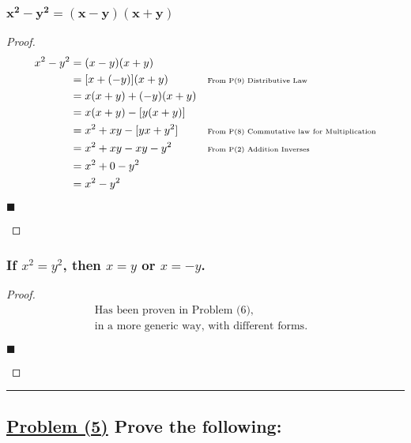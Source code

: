 \documentclass[letterpaper, 10 pt, conference]{ieeeconf}  %
\begin{document}
\subsubsection{$\boldsymbol{x^2 - y^2 = (x - y)(x + y)}$}

\begin{proof}
\begin{align}
     x^2 - y^2&= (x - y)(x + y) && \\
     &=[x + (-y)](x + y) && \text{\tiny{From P(9) Distributive Law}} \\ 
     &=x(x + y) + (-y)(x +y) &&\\
     &=x(x + y) - [y(x +y)] &&\\
     &=x^2 + xy - [yx + y^2] && \text{\tiny{From P(8) Commutative law for Multiplication}}\\
     &=x^2 + xy - xy - y^2 && \text{\tiny{From P(2) Addition Inverses}}\\
     &=x^2 + 0 - y^2 &&\\
     &=x^2 - y^2 &&
\end{align}
\begin{flushright}
$\blacksquare$
\end{flushright}
\end{proof}


\subsubsection{\textbf{If $x^2 = y^2$, then $x = y$ or $x = -y$.}}


\begin{proof}
\begin{align}
    & \text{Has been proven in Problem (6),} && \\
    & \text{in a more generic way, with different forms.}
\end{align}
\begin{flushright}
$\blacksquare$
\end{flushright}
\end{proof}

\noindent\rule{8cm}{0.4pt}
\begin{figure}[thpb]
      \centering
\end{figure}
\subsection{\textbf{\underline{Problem (5)} Prove the following:}}
\end{document}
